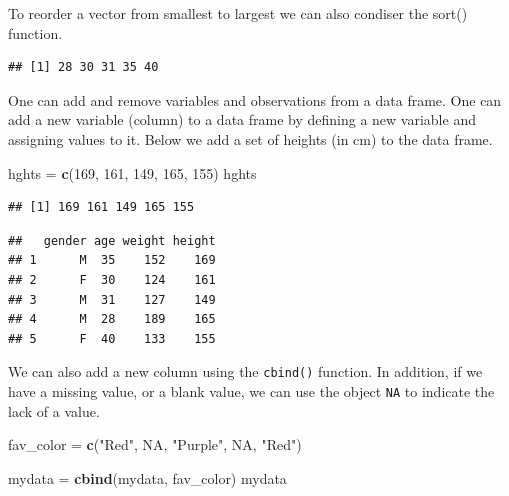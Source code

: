\documentclass[
]{book}
\newenvironment{Shaded}{\begin{snugshade}}{\end{snugshade}}
\newcommand{\DecValTok}[1]{\textcolor[rgb]{0.00,0.00,0.81}{#1}}
\newcommand{\KeywordTok}[1]{\textcolor[rgb]{0.13,0.29,0.53}{\textbf{#1}}}
\newcommand{\NormalTok}[1]{#1}
\newcommand{\OperatorTok}[1]{\textcolor[rgb]{0.81,0.36,0.00}{\textbf{#1}}}
\newcommand{\OtherTok}[1]{\textcolor[rgb]{0.56,0.35,0.01}{#1}}
\newcommand{\StringTok}[1]{\textcolor[rgb]{0.31,0.60,0.02}{#1}}
\begin{document}
To reorder a vector from smallest to largest we can also condiser the sort() function.

\begin{Shaded}
\end{Shaded}

\begin{verbatim}
## [1] 28 30 31 35 40
\end{verbatim}

One can add and remove variables and observations from a data frame. One can add a new variable (column) to a data frame by defining a new variable and assigning values to it. Below we add a set of heights (in cm) to the data frame.

\begin{Shaded}
\begin{Highlighting}[]
\NormalTok{hghts =}\StringTok{ }\KeywordTok{c}\NormalTok{(}\DecValTok{169}\NormalTok{, }\DecValTok{161}\NormalTok{, }\DecValTok{149}\NormalTok{, }\DecValTok{165}\NormalTok{, }\DecValTok{155}\NormalTok{)}
\NormalTok{hghts}
\end{Highlighting}
\end{Shaded}

\begin{verbatim}
## [1] 169 161 149 165 155
\end{verbatim}

\begin{Shaded}
\end{Shaded}

\begin{verbatim}
##   gender age weight height
## 1      M  35    152    169
## 2      F  30    124    161
## 3      M  31    127    149
## 4      M  28    189    165
## 5      F  40    133    155
\end{verbatim}

We can also add a new column using the \texttt{cbind()} function. In addition, if we have a missing value, or a blank value, we can use the object \texttt{NA} to indicate the lack of a value.

\begin{Shaded}
\begin{Highlighting}[]
\NormalTok{fav_color =}\StringTok{ }\KeywordTok{c}\NormalTok{(}\StringTok{"Red"}\NormalTok{, }\OtherTok{NA}\NormalTok{, }\StringTok{"Purple"}\NormalTok{, }\OtherTok{NA}\NormalTok{, }\StringTok{"Red"}\NormalTok{)}

\NormalTok{mydata =}\StringTok{ }\KeywordTok{cbind}\NormalTok{(mydata, fav_color)}
\NormalTok{mydata}
\end{Highlighting}
\end{Shaded}
\end{document}
